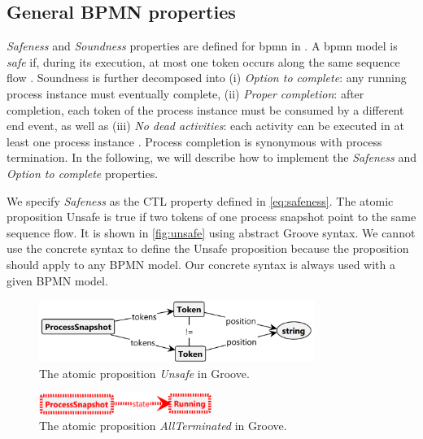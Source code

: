 \documentclass{lmcs} %
\theoremstyle{plain}\newtheorem{satz}[thm]{Satz} %
\begin{document}
\subsection{General BPMN properties}
\textit{Safeness} and \textit{Soundness} properties are defined for \gls*{bpmn} in \cite{corradiniClassificationBPMNCollaborations2018}.
A \gls*{bpmn} model is \textit{safe} if, during its execution, at most one token occurs along the same sequence flow \cite{corradiniClassificationBPMNCollaborations2018}.
Soundness is further decomposed into (i) \textit{Option to complete}: any running process instance must eventually complete, (ii) \textit{Proper completion}: after completion, each token of the process instance must be consumed by a different end event, as well as (iii) \textit{No dead activities}: each activity can be executed in at least one process instance \cite{corradiniClassificationBPMNCollaborations2018}.
Process completion is synonymous with process termination.
In the following, we will describe how to implement the \textit{Safeness} and \textit{Option to complete} properties.

We specify \textit{Safeness} as the CTL property defined in \eqref{eq:safeness}.
The atomic proposition \textsf{Unsafe} is true if two tokens of one process snapshot point to the same sequence flow.
It is shown in \autoref{fig:unsafe} using abstract Groove syntax.
We cannot use the concrete syntax to define the \textsf{Unsafe} proposition because the proposition should apply to any BPMN model.
Our concrete syntax is always used with a given BPMN model.

\begin{figure}[ht]
    \centering
    \includegraphics[width=0.8\textwidth]{images/Unsafe.png}
    \caption{The atomic proposition \textit{Unsafe} in Groove.}
    \label{fig:unsafe}
\end{figure}

\begin{figure}[ht]
    \centering
    \includegraphics[width=0.5\textwidth]{images/AllTerminated.png}
    \caption{The atomic proposition \textit{AllTerminated} in Groove.}
    \label{fig:allTerminated}
\end{figure}
\end{document}
